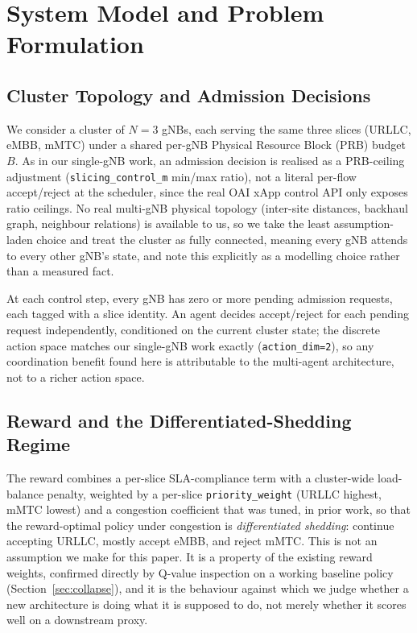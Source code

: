 \documentclass[journal]{IEEEtran}
\begin{document}
\section{System Model and Problem Formulation}
\label{sec:system-model}

\subsection{Cluster Topology and Admission Decisions}
We consider a cluster of $N{=}3$ gNBs, each serving the same three
slices (URLLC, eMBB, mMTC) under a shared per-gNB Physical Resource
Block (PRB) budget $B$. As in our single-gNB work, an admission
decision is realised as a PRB-ceiling adjustment
(\texttt{slicing\_control\_m} min/max ratio), not a literal per-flow
accept/reject at the scheduler, since the real OAI xApp control API
only exposes ratio ceilings. No real multi-gNB physical topology
(inter-site distances, backhaul graph, neighbour relations) is
available to us, so we take the least assumption-laden choice and
treat the cluster as fully connected, meaning every gNB attends to every
other gNB's state, and note this explicitly as a modelling choice
rather than a measured fact.

At each control step, every gNB has zero or more pending admission
requests, each tagged with a slice identity. An agent decides
accept/reject for each pending request independently, conditioned on
the current cluster state; the discrete action space matches our
single-gNB work exactly (\texttt{action\_dim=2}), so any coordination
benefit found here is attributable to the multi-agent architecture,
not to a richer action space.

\subsection{Reward and the Differentiated-Shedding Regime}
The reward combines a per-slice SLA-compliance term with a cluster-wide
load-balance penalty, weighted by a per-slice \texttt{priority\_weight}
(URLLC highest, mMTC lowest) and a congestion coefficient that was
tuned, in prior work, so that the reward-optimal policy under
congestion is \emph{differentiated shedding}: continue accepting
URLLC, mostly accept eMBB, and reject mMTC. This is not an assumption
we make for this paper. It is a property of the existing reward
weights, confirmed directly by Q-value inspection on a working
baseline policy (Section~\ref{sec:collapse}), and it is the behaviour
against which we judge whether a new architecture is doing what it is
supposed to do, not merely whether it scores well on a downstream
proxy.
\end{document}
